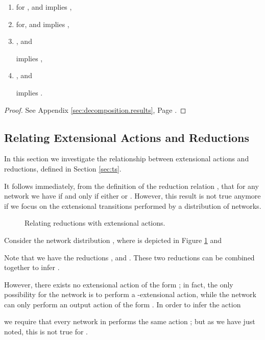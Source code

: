 \documentclass{LMCS}
\begin{document}
\begin{prop}
\begin{enumerate}
\begin{enumerate}[label=(\roman*)]
\item  for , 
 and  
	implies ,

\item  for, 
 and  
	implies ,

\item , 
	 and 
       
      implies 
      , 

\item , 
	 and 
       
      implies 
      .
	\end{enumerate}
  \end{enumerate}
\end{prop}
\begin{proof}
  See Appendix \ref{sec:decomposition.results}, Page \pageref{proof:composition}.
\end{proof}



\subsection{Relating Extensional Actions and Reductions}
\label{sec:relating}
In this section we investigate the relationship between 
extensional actions and reductions, defined in Section 
\ref{sec:ts}. 

It follows immediately, from the definition of the 
reduction relation , that for any 
network  we have  
if and only if either  
or . 
However, this result is not true anymore if we 
focus on the extensional transitions performed 
by a distribution of networks. 
\begin{figure}
\begin{center}
\end{center}
\caption{Relating reductions with extensional actions.}
\label{fig:red.ext}
\end{figure}

\begin{exa} 
\label{ex:red.ext}
Consider the network distribution , 
where  is depicted in Figure \ref{fig:red.ext} and 

\noindent
Note that we have the reductions , and 
. These two 
reductions can be combined together to infer  
.

However, there exists no extensional action of the form ; in fact, 
the only possibility for the network  is 
to perform a -extensional action, while the network  can only perform an output action of 
the form . In order to infer the action 
 
we require that every network in  
performs the same action ; but as we have just noted, 
this is not true for .
\end{exa}
\end{document}
